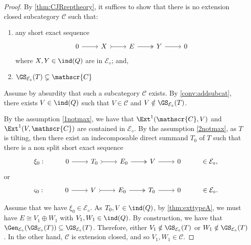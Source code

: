 \begin{proof}
By \cref{thm:CJRreptheory}, it suffices to show that there is no extension closed subcategory $\mathscr{C}$ such that: 
\begin{enumerate}[label=$(\arabic*)$, itemsep=1mm]
    \item \label{1notmax} any short exact sequence  \[\begin{tikzcd}
	0 & X & E & Y &  0
	\arrow[from=1-1, to=1-2]
	\arrow[tail, from=1-2, to=1-3]
	\arrow[two heads,from=1-3, to=1-4]
	\arrow[from=1-4, to=1-5]
\end{tikzcd}\] where $X,Y \in \ind(Q)$ are in $\mathcal{E}_\diamond$; and,
\item \label{2notmax}  $\GS_{\mathcal{E}_\diamond}(T) \subsetneq \mathscr{C}$
\end{enumerate}
Assume by absurdity that such a subcategory $\mathscr{C}$ exists. By \cref{conv:addsubcat}, there exists $V \in \ind(Q)$ such that $V \in \mathscr{C}$ and $V \notin \GS_{\mathcal{E}_\diamond}(T)$.

By the assumption \ref{1notmax}, we have that $\Ext^1(\mathscr{C},V)$ and $\Ext^1(V,\mathscr{C})$ are contained in $\mathcal{E_\diamond}$. By the assumption \ref{2notmax}, as $T$ is tilting, then there exist an indecomposable direct summand $T_0$ of $T$ such that there is a non split short exact sequence \[\begin{tikzcd}
	\xi_0: & 0 & T_0 & E_0 & V &  0 & \in \mathcal{E}_\diamond,
	\arrow[from=1-2, to=1-3]
	\arrow[tail, from=1-3, to=1-4]
	\arrow[two heads,from=1-4, to=1-5]
	\arrow[from=1-5, to=1-6]
\end{tikzcd}\]  or \[\begin{tikzcd}
	\varsigma_0: & 0 & V & E_0 & T_0 &  0 & \in \mathcal{E}_\diamond.
	\arrow[from=1-2, to=1-3]
	\arrow[tail, from=1-3, to=1-4]
	\arrow[two heads,from=1-4, to=1-5]
	\arrow[from=1-5, to=1-6]
\end{tikzcd}\]

Assume that we have $\xi_0 \in \mathcal{E}_\diamond$. As $T_0, V \in \ind(Q)$, by \cref{thm:exttypeA}, we must have $E \cong V_1 \oplus W_1$ with $V_1,W_1 \in \ind(Q)$. By construction, we have that $\Gen_\mathcal{E_\diamond}(\GS_{\mathcal{E_\diamond}}(T)) \subseteq \GS_{\mathcal{E_\diamond}}(T)$. Therefore, either $V_1 \notin \GS_{\mathcal{E_\diamond}}(T)$ or $W_1 \notin \GS_{\mathcal{E_\diamond}}(T)$. In the other hand, $\mathscr{C}$ is extension closed, and so $V_1,W_1 \in \mathscr{C}$.


\end{proof}
